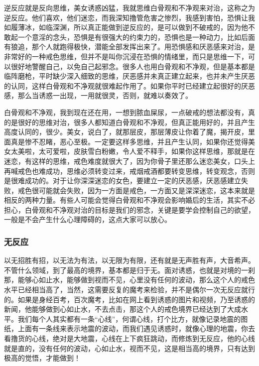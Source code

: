 \documentclass{ctexart}
\begin{document}
逆反应就是反向思维，美女诱惑凶猛，我就思维白骨观和不净观来对治，这称之为逆反应。他们喜欢，他们迷恋，而我深知撸管危害之惨烈，我感到害怕，恐惧让我如履薄冰，如临深渊，所以真正能做到逆反应的，是可以做到不破戒的，因为他不敢起一个意淫的念头，恐惧是有很强大的约束力的，恐惧也是一种动力，比如后面有狼追，那个人就跑得极快，潜能全部发挥出来了。用恐惧感和厌恶感来对治，是非常好的一种戒色思维，但并不是叫你沉浸在恐惧的情绪里，而只是思维一下，可以很好地警醒自己，以免自己起邪念。很多人也用白骨观和不净观，但是基本都是临阵磨枪，平时缺少深入细致的思维，厌恶感并未真正建立起来，也并未产生厌恶的认同，这样白骨观和不净观就很难起作用了。如果你平时已经建立起很好的厌恶感，那么当诱惑一出现，一用就很灵，否则，就难以奏效了。

白骨观和不净观，我到现在还在用，一想到脓血屎尿，一点破戒的想法都没有，真的是很好的思维对治，很多人都知道白骨观和不净观，但真正能用好的，并且产生高度认同的，很少。美女，说白了，就那层皮，那层薄皮让你着了魔，揭开皮，里面真是惨不忍睹，恶心至极。一定要这样多思维，并且产生认同，如果你还觉得美女太美啦，太可爱啦，皮肤雪白粉嫩，令人爱不释手，如果你这样思维，那就是在迷恋，有这样的思维，戒色难度就很大了，因为你骨子里还那么迷恋美女，口头上再喊戒色也难成功，思维必须转变过来，戒烟戒酒都要转变思维，转变观念，否则是很难成功的。对于让你深深迷恋的女色，要建立一定的厌恶感，厌恶感建立失败，戒色很可能就会失败，因为一方面是戒色，一方面又是深深迷恋，这本来就是相反的两种力量。有些人可能会觉得白骨观和不净观会影响婚后的生活，其实不必担心，白骨观和不净观对治的目标是我们的邪念，关键是要学会控制自己的欲望，一般是不会产生什么心理障碍的，这点大家可以放心。

\subsubsection{无反应}

以无招胜有招，以无法为有法，以无限为有限，还有就是无声胜有声，大音希声。不管什么领域，到了最高的境界，基本都是归于无。面对诱惑，也就是对境的一刹那，能够心如止水，能够做到视而不见，心里没有任何的波动，那么这个人的戒色水平已经相当高了，当然，这需要反复的魔考来检验，并不是偶尔一次无反应就行的。如果是身经百考，百次魔考，比如在网上看到诱惑的图片和视频，乃至诱惑的新闻，他能够做到心如止水，不去点击，那这个人的戒色境界已经达到了大成水平。我们每个人其实都有一条“心线”，何谓心线，打个比方，就像记录地震的图纸，上面有一条线来表示地震的波动，而我们遇见诱惑时，就像心理的地震，你去看撸货的心线，绝对是大地震，心线在上下疯狂跳动，而修炼到无反应，他的心线就是直的，没有任何的波动，心如止水，视而不见，这是相当高的境界，只有达到极高的觉悟，才能做到！
\end{document}

